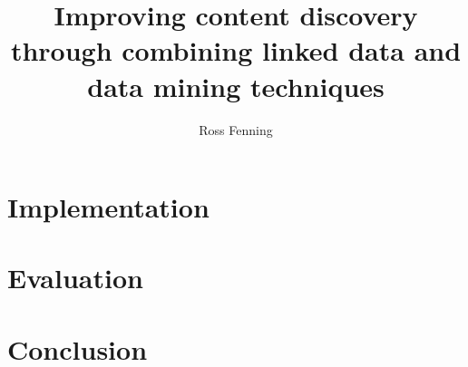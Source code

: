 \documentclass[10pt,a4paper]{report}
\title{Improving content discovery through combining linked data and data mining techniques}
\author{Ross Fenning}
\begin{document}
\maketitle
\tableofcontents





\chapter{Implementation}
\label{chp:implementation}

\chapter{Evaluation}
\label{chp:evaluation}

\chapter{Conclusion}



\end{document}
